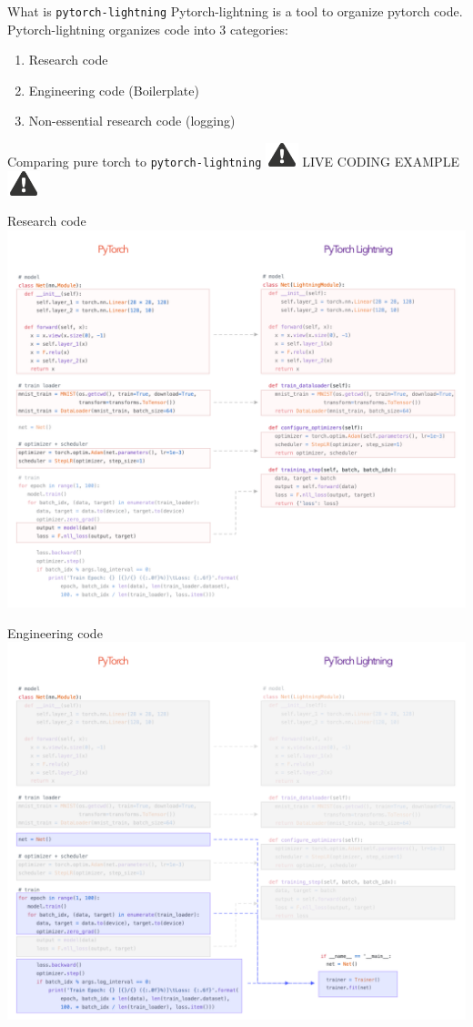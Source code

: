 \documentclass[aspectratio=169]{beamer}
\newcommand{\alertsymb}{\includegraphics[height=0.7cm]{alert.png}}
\newcommand{\livecode}{\Large \centering \alertsymb \hspace{1em}
	LIVE CODING EXAMPLE \hspace{1em} \alertsymb}
\begin{document}
	\begin{frame}{What is \texttt{pytorch-lightning}}
		Pytorch-lightning is a tool to organize pytorch code.\\
		Pytorch-lightning organizes code into 3 categories:
		\begin{enumerate}
			\item Research code
			\item Engineering code (Boilerplate)
			\item Non-essential research code (logging)
		\end{enumerate}
	\end{frame}

	\begin{frame}{Comparing pure torch to \texttt{pytorch-lightning}}
		\livecode
	\end{frame}

	\begin{frame}{Research code}
		\centering
		\includegraphics[height=0.9\textheight]{pt_to_pl.png}
	\end{frame}

	\begin{frame}{Engineering code}
		\centering
		\includegraphics[height=0.9\textheight]{pt_trainer.png}
	\end{frame}
\end{document}
